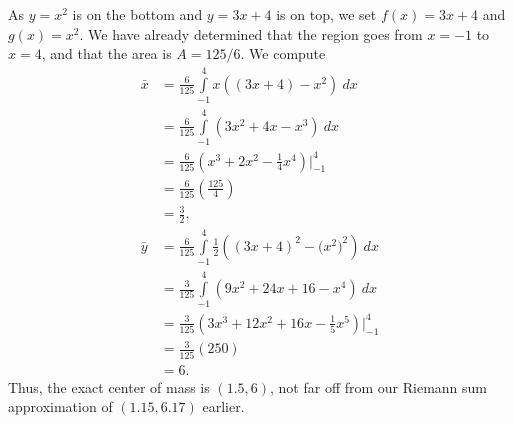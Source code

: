 {As $y=x^2$ is on the bottom and $y=3x+4$ is on top, we set $f(x)=3x+4$ and $g(x)=x^2$.  We have already determined that the region goes from $x=-1$ to $x=4$, and that the area is $A=125/6$.  We compute
\begin{align*}
\bar{x} &= \frac{6}{125} \int\limits_{-1}^4 x\left((3x+4)-x^2 \right)\ dx\\
&= \frac{6}{125} \int\limits_{-1}^4 \left(3x^2 + 4x - x^3\right)\ dx\\
&= \frac{6}{125} \left(x^3 + 2x^2 - \frac{1}{4}x^4\right)\Big|_{-1}^4\\
&= \frac{6}{125} \left(\frac{125}{4} \right)\\
&= \frac32,\\
\bar{y} &= \frac{6}{125} \int\limits_{-1}^4 \frac{1}{2}\left((3x+4)^2 - \big(x^2\big)^2 \right)\ dx\\
&= \frac{3}{125} \int\limits_{-1}^4 \left(9x^2 + 24x + 16 - x^4 \right)\ dx\\
&= \frac{3}{125} \left( 3x^3 + 12x^2 +16x - \frac{1}{5}x^5 \right)\Big|_{-1}^4\\
&= \frac{3}{125} (250)\\
&= 6.
\end{align*}
Thus, the exact center of mass is $(1.5, 6)$, not far off from our Riemann sum approximation of $(1.15, 6.17)$ earlier.
}\\

